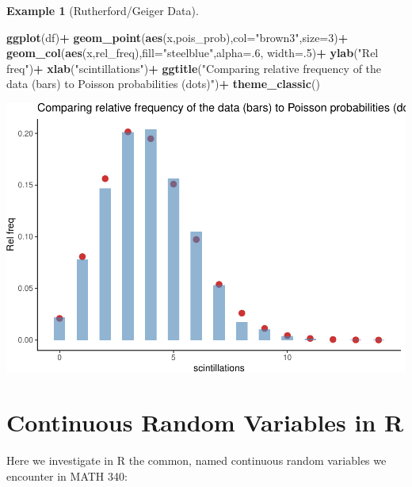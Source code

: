 \documentclass[
]{book}
\newenvironment{Shaded}{\begin{snugshade}}{\end{snugshade}}
\newcommand{\AttributeTok}[1]{\textcolor[rgb]{0.13,0.29,0.53}{#1}}
\newcommand{\DecValTok}[1]{\textcolor[rgb]{0.00,0.00,0.81}{#1}}
\newcommand{\FunctionTok}[1]{\textcolor[rgb]{0.13,0.29,0.53}{\textbf{#1}}}
\newcommand{\NormalTok}[1]{#1}
\newcommand{\SpecialCharTok}[1]{\textcolor[rgb]{0.81,0.36,0.00}{\textbf{#1}}}
\newcommand{\StringTok}[1]{\textcolor[rgb]{0.31,0.60,0.02}{#1}}
\theoremstyle{definition}
\theoremstyle{definition}
\newtheorem{example}{Example}[chapter]
\theoremstyle{definition}
\theoremstyle{definition}
\theoremstyle{remark}
\begin{document}
\begin{example}[Rutherford/Geiger Data]
\begin{Shaded}
\begin{Highlighting}[]
\FunctionTok{ggplot}\NormalTok{(df)}\SpecialCharTok{+}
  \FunctionTok{geom\_point}\NormalTok{(}\FunctionTok{aes}\NormalTok{(x,pois\_prob),}\AttributeTok{col=}\StringTok{"brown3"}\NormalTok{,}\AttributeTok{size=}\DecValTok{3}\NormalTok{)}\SpecialCharTok{+}
  \FunctionTok{geom\_col}\NormalTok{(}\FunctionTok{aes}\NormalTok{(x,rel\_freq),}\AttributeTok{fill=}\StringTok{"steelblue"}\NormalTok{,}\AttributeTok{alpha=}\NormalTok{.}\DecValTok{6}\NormalTok{, }\AttributeTok{width=}\NormalTok{.}\DecValTok{5}\NormalTok{)}\SpecialCharTok{+}
  \FunctionTok{ylab}\NormalTok{(}\StringTok{"Rel freq"}\NormalTok{)}\SpecialCharTok{+}
  \FunctionTok{xlab}\NormalTok{(}\StringTok{"scintillations"}\NormalTok{)}\SpecialCharTok{+}
  \FunctionTok{ggtitle}\NormalTok{(}\StringTok{"Comparing relative frequency of the data (bars) to Poisson probabilities (dots)"}\NormalTok{)}\SpecialCharTok{+}
  \FunctionTok{theme\_classic}\NormalTok{()}
\end{Highlighting}
\end{Shaded}

\includegraphics{math340-notes_files/figure-latex/unnamed-chunk-166-1.pdf}

\end{example}

\chapter{Continuous Random Variables in R}\label{R-continuousRV}

Here we investigate in R the common, named continuous random variables we encounter in MATH 340:
\end{document}
